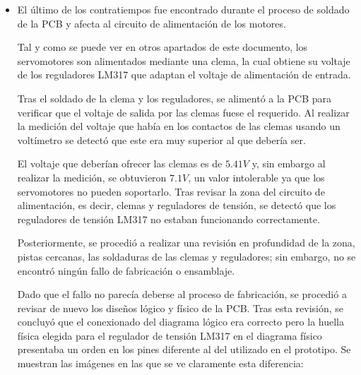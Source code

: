 \begin{itemize}
    \begin{figure}[H]
    \centering 
    \texttt{[image: pictures/SoldaduraPrecisión.jpg]}
    \caption{Soldadura del hilo de reconexión con el nuevo pin.}
    \label{fig:Reconex_Soldadura}
    \end{figure}
    Tal y como se puede observar en las figuras anteriores (imágenes \ref{fig:Reconex} y \ref{fig:Reconex_Soldadura}), el reducido tamaño de la soldadura requirió que este proceso fuese realizado con máxima precisión. Además, por precaución, se eliminó parte de la pista original para evitar errores en la señal.
    
    A pesar de que esta solución es de carácter artesanal y lo recomendable hubiese sido fabricar de nuevo la \ac{PCB}, se tomó la decisión de realizar este arreglo para reducir el impacto del contratiempo en el proyecto, ya que además se comprobó un buen resultado y fue suficientemente segura.
   
   \item El último de los contratiempos fue encontrado durante el proceso de soldado de la \ac{PCB} y afecta al circuito de alimentación de los motores.
   
   Tal y como se puede ver en otros apartados de este documento, los servomotores son alimentados mediante una clema, la cual obtiene su voltaje de los reguladores LM317 que adaptan el voltaje de alimentación de entrada.
   
   Tras el soldado de la clema y los reguladores, se alimentó a la \ac{PCB} para verificar que el voltaje de salida por las clemas fuese el requerido. Al realizar la medición del voltaje que había en los contactos de las clemas usando un voltímetro se detectó que este era muy superior al que debería ser.
   
   El voltaje que deberían ofrecer las clemas es de $5.41V$ y, sin embargo al realizar la medición, se obtuvieron $7.1V$, un valor intolerable ya que los servomotores no pueden soportarlo. Tras revisar la zona del circuito de alimentación, es decir, clemas y reguladores de tensión, se detectó que los reguladores de tensión LM317 no estaban funcionando correctamente.
   
   Posteriormente, se procedió a realizar una revisión en profundidad de la zona, pistas cercanas, las soldaduras de las clemas y reguladores; sin embargo, no se encontró ningún fallo de fabricación o ensamblaje.
   
   Dado que el fallo no parecía deberse al proceso de fabricación, se procedió a revisar de nuevo los diseños lógico y físico de la \ac{PCB}. Tras esta revisión, se concluyó que el conexionado del diagrama lógico era correcto pero la huella física elegida para el regulador de tensión LM317 en el diagrama físico presentaba un orden en los pines diferente al del utilizado en el prototipo. Se muestran las imágenes en las que se ve claramente esta diferencia:
   

\end{itemize}
